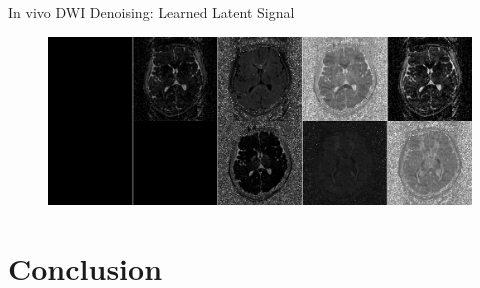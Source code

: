 \documentclass[hyperref={colorlinks=true,linkcolor=blue}, aspectratio=169]{beamer}
\begin{document}
	\begin{frame}{In vivo DWI Denoising: Learned Latent Signal}
		\begin{figure}
			\includegraphics[width=\textwidth]{figures/MUSE_train_DAE_Latent10_Depth04_epoch0100_latent.png}
		\end{figure}
	\end{frame}

	\section{Conclusion}
	
\end{document}
